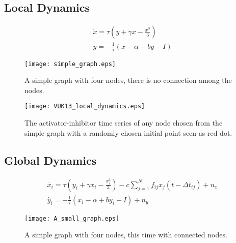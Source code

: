\documentclass[12pt]{article}
\begin{document}
\newpage

\subsection{Local Dynamics}

\begin{subequations}
 \begin{align}\dot{x} = \tau (y + \gamma x - \frac{x^3}{3})  \label{eqn: frobenius 17}\\  \dot{y} = -\frac{1}{\tau} (x - \alpha + b y - I ) \label{eqn: frobenius 18}   \end{align} 
\end{subequations}

\begin{figure}[h!]
	\centering
	\texttt{[image: simple\_graph.eps]}
		\caption{A simple graph with four nodes, there is no connection among the nodes.}
\end{figure}


\begin{figure}[h!]
	\centering
	\texttt{[image: VUK13\_local\_dynamics.eps]}
		\caption{The activator-inhibitor time series of any node chosen from the simple graph with a randomly chosen initial point seen as red dot.}
\end{figure}

\newpage

\subsection{Global Dynamics}

\begin{subequations}
 \begin{align}\dot{x_i} = \tau (y_i + \gamma x_i - \frac{x_i^3}{3}) -c \sum_{j=1}^N f_{ij}x_j(t - \Delta t_{ij}) +n_x \label{eqn: frobenius 17}\\  \dot{y_i} = -\frac{1}{\tau} (x_i - \alpha + b y_i - I ) +n_y \label{eqn: frobenius 18}   \end{align} 
\end{subequations}


\begin{figure}[h!]
	\centering
	\texttt{[image: A\_small\_graph.eps]}
		\caption{A simple graph with four nodes, this time with connected nodes.}
\end{figure}
\end{document}

